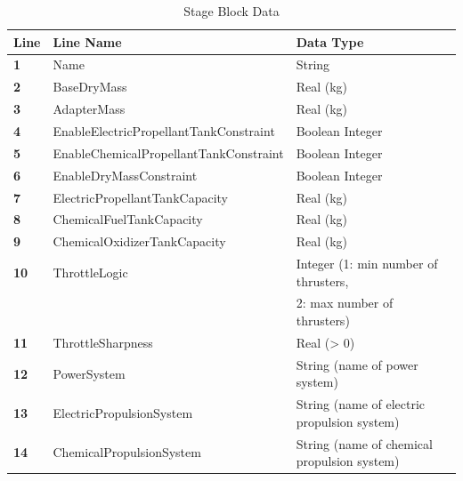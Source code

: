 \begin{table}[ht]
    \centering
    \begin{tabular}{lll}
    \hline
    \textbf{Line} & \textbf{Line Name} & \textbf{Data Type} \\
    \hline
    \textbf{1} & Name & String \\
    \textbf{2} & BaseDryMass & Real (kg) \\
    \textbf{3} & AdapterMass & Real (kg) \\
    \textbf{4} & EnableElectricPropellantTankConstraint & Boolean Integer \\
    \textbf{5} & EnableChemicalPropellantTankConstraint & Boolean Integer\\
    \textbf{6} & EnableDryMassConstraint & Boolean Integer \\
    \textbf{7} & ElectricPropellantTankCapacity & Real (kg) \\
    \textbf{8} & ChemicalFuelTankCapacity & Real (kg) \\
    \textbf{9} & ChemicalOxidizerTankCapacity & Real (kg) \\
    \textbf{10} & ThrottleLogic & Integer (1: min number of thrusters, \\ & & \hspace{3em}\hspace{5pt} 2: max number of thrusters) \\
    \textbf{11} & ThrottleSharpness & Real (> 0) \\
    \textbf{12} & PowerSystem & String (name of power system) \\
    \textbf{13} & ElectricPropulsionSystem & String (name of electric propulsion system) \\
    \textbf{14} & ChemicalPropulsionSystem & String (name of chemical propulsion system) \\
    \end{tabular}
    \caption{Stage Block Data}
    \label{tab:spacecraft_stage_block_general}
\end{table}

